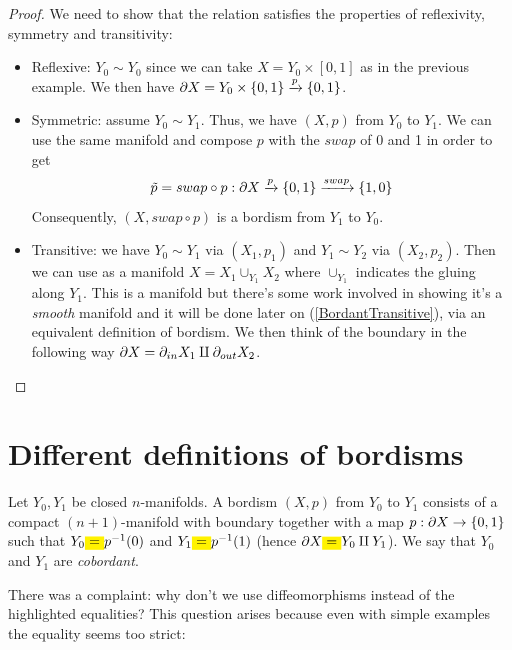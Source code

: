 \begin{proof}
We need to show that the relation satisfies the properties of reflexivity, symmetry and transitivity:
\begin{itemize}
    \item Reflexive: $Y_0 \sim Y_0$ since we can take $X = Y_0 \times [0,1]$ as in the previous example. We then have $\partial X = Y_0 \times \{0,1\} \xrightarrow{p} \{0,1\}$. 
    \item Symmetric: assume $Y_0 \sim Y_1$. Thus, we have $(X,p)$ from $Y_0$ to $Y_1$. We can use the same manifold and compose $p$ with the $swap$ of 0 and 1 in order to get 
    $$\tilde{p}=swap \circ p:\partial X\xrightarrow{p}\{0,1\}\xrightarrow{swap}\{1,0\}$$ Consequently, $(X, swap \circ p)$ is a bordism from $Y_1$ to $Y_0$.
    \item Transitive: we have $Y_0 \sim Y_1$ via $(X_1, p_1)$ and $Y_1 \sim Y_2$ via $(X_2, p_2)$. 
    Then we can use as a manifold $X = X_1 \cup_{Y_1} X_2$ where $\cup_{Y_1}$ indicates the gluing along $Y_1$. 
    This is a manifold but there's some work involved in showing it's a \textit{smooth} manifold and it will be done later 
    on (\ref{BordantTransitive}), via an equivalent definition of bordism. We then think of the boundary in the following
     way $\partial X = \partial_{in} X_1 \amalg \partial_{out} X_2$.
\end{itemize}
\end{proof}

\section{Different definitions of bordisms} %
\label{sec:different_definitions_of_bordisms}

\begin{rmnd}
Let $Y_0, Y_1$ be closed $n$-manifolds. A bordism $(X,p)$ from $Y_0$ to $Y_1$ consists of a compact $(n+1)$-manifold with boundary together with a map $p: \partial X \to \{0,1\}$ such that $Y_0 \text{\colorbox{yellow}{=}} p^{-1}(0)$ and $Y_1 \text{\colorbox{yellow}{=}} p^{-1}(1)$ (hence $\de X \text{\colorbox{yellow}{=}}  Y_0 \amalg Y_1$). We say that $Y_0$ and $Y_1$ are \textit{cobordant}.
\end{rmnd}

\noindent There was a complaint: why don't we use diffeomorphisms instead of the highlighted equalities? This question arises because even with simple examples the equality seems too strict:

